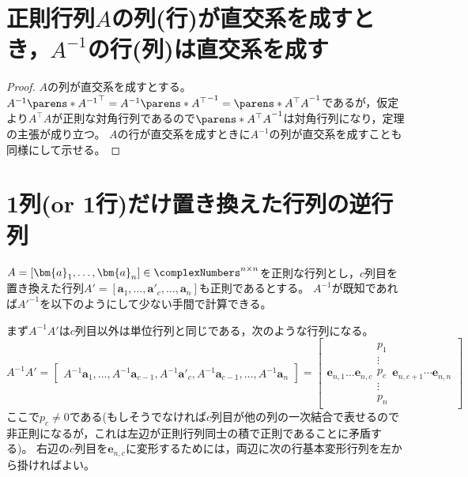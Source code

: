     \section{正則行列\texorpdfstring{$A$}{A}の列(行)が直交系を成すとき，\texorpdfstring{$A^{-1}$}{Aの逆行列}の行(列)は直交系を成す}
        \label{行列の列(行)の直交性と逆行列の行(列)の直交性}
        \begin{proof}
            $A$の列が直交系を成すとする。
            $A^{-1}\parens*{A^{-1}}^\top = A^{-1}\parens*{A^\top}^{-1} = \parens*{A^\top A}^{-1}$であるが，仮定より$A^\top A$が正則な対角行列であるので$\parens*{A^\top A}^{-1}$は対角行列になり，定理の主張が成り立つ。
            $A$の行が直交系を成すときに$A^{-1}$の列が直交系を成すことも同様にして示せる。
        \end{proof}
    \section{1列(or 1行)だけ置き換えた行列の逆行列}
        $A=[\bm{a}_1,\dotsc,\bm{a}_n]\in\complexNumbers^{n\times n}$を正則な行列とし，$c$列目を置き換えた行列$A'=[\bm{a}_1,\dotsc,\bm{a}'_c,\dotsc,\bm{a}_n]$も正則であるとする。
        $A^{-1}$が既知であれば$A'^{-1}$を以下のようにして少ない手間で計算できる。
        \par
        まず$A^{-1}A'$は$c$列目以外は単位行列と同じである，次のような行列になる。
        \[
            A^{-1}A' =
            \begin{bmatrix}
                A^{-1}\bm{a}_1, \dotsc, A^{-1}\bm{a}_{c-1}, A^{-1}\bm{a}'_c, A^{-1}\bm{a}_{c-1}, \dotsc, A^{-1}\bm{a}_n
            \end{bmatrix}
            =
            \begin{bmatrix}
                \bm{e}_{n,1}\dotsc\bm{e}_{n,c}
                \begin{matrix}
                    p_1 \\
                    \vdots \\
                    p_c \\
                    \vdots \\
                    p_n
                \end{matrix}
                \bm{e}_{n,c+1}\cdots\bm{e}_{n,n}
            \end{bmatrix}
        \]
        ここで$p_c\neq 0$である(もしそうでなければ$c$列目が他の列の一次結合で表せるので非正則になるが，これは左辺が正則行列同士の積で正則であることに矛盾する)。
        右辺の$c$列目を$\bm{e}_{n,c}$に変形するためには，両辺に次の行基本変形行列を左から掛ければよい。
